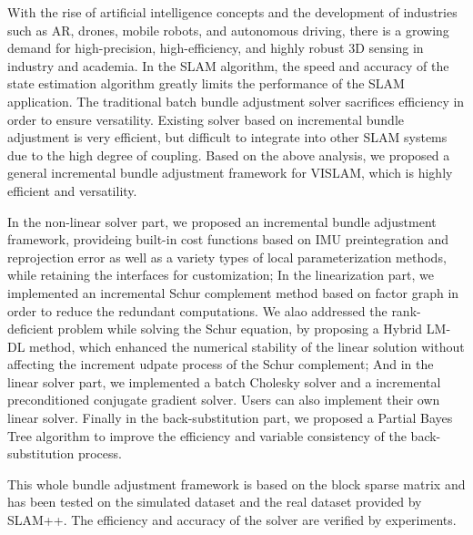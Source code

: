 \begin{englishabstract}
    With the rise of artificial intelligence concepts and the development of industries such as AR, drones, mobile robots, and autonomous driving, there is a growing demand for high-precision, high-efficiency, and highly robust 3D sensing in industry and academia. In the SLAM algorithm, the speed and accuracy of the state estimation algorithm greatly limits the performance of the SLAM application. The traditional batch bundle adjustment solver sacrifices efficiency in order to ensure versatility. Existing solver based on incremental bundle adjustment is very efficient, but difficult to integrate into other SLAM systems due to the high degree of coupling. Based on the above analysis, we proposed a general incremental bundle adjustment framework for VISLAM, which is highly efficient and versatility.

    In the non-linear solver part, we proposed an incremental bundle adjustment framework, provideing built-in cost functions based on IMU preintegration and reprojection error as well as a variety types of local parameterization methods, while retaining the interfaces for customization; In the linearization part, we implemented an incremental Schur complement method based on factor graph in order to reduce the redundant computations. We alao addressed the rank-deficient problem while solving the Schur equation, by proposing a Hybrid LM-DL method, which enhanced the numerical stability of the linear solution without affecting the increment udpate process of the Schur complement; And in the linear solver part, we implemented a batch Cholesky solver and a incremental preconditioned conjugate gradient solver. Users can also implement their own linear solver. Finally in the back-substitution part, we proposed a Partial Bayes Tree algorithm to improve the efficiency and variable consistency of the back-substitution process.

    This whole bundle adjustment framework is based on the block sparse matrix and has been tested on the simulated dataset and the real dataset provided by SLAM++. The efficiency and accuracy of the solver are verified by experiments.

\end{englishabstract}
